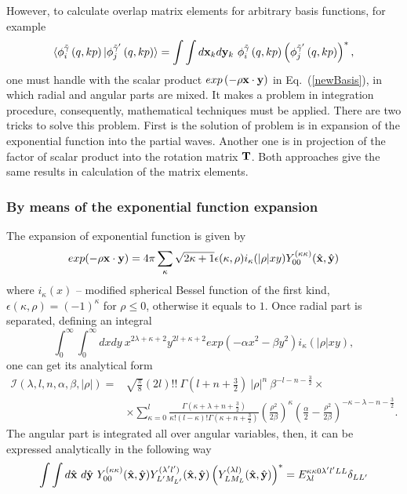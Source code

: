 \documentclass[12pt,a4paper,twoside]{article}
\begin{document}
However, to calculate overlap matrix elements for arbitrary basis functions, for example
\begin{equation}
\langle \phi_{i}^{\tilde{\gamma}}\left(q,kp \right) \vert 
\phi_{j}^{\tilde{\gamma}^{\prime}}\left(q,kp \right) \rangle =
\int \int d{\bf x}_k d{\bf y}_k ~\phi_{i}^{\tilde{\gamma}}\left(q,kp \right) \left( \phi_{j}^{\tilde{\gamma}^{\prime}}\left(q,kp \right) \right)^{*},
\label{me_arb}
\end{equation}
one must handle with the scalar product $exp\left(- \rho {\bf x} \cdot {\bf y} \right)$ in  Eq.~(\ref{newBasis}), in which radial and angular parts are mixed. It makes a problem in integration procedure, consequently, mathematical techniques must be applied. There are two tricks to solve this problem.  First is the solution of problem is in expansion of  the exponential function into the partial waves. Another one is in projection of the factor of scalar product into the rotation matrix ${\bf T}$. Both approaches give the same results in calculation of the matrix elements. 
\subsubsection{By means of the  exponential function expansion}
\label{overlap_by_exp}
The expansion of exponential function is given by 
\begin{equation}
exp(-\rho {\bf x} \cdot {\bf y}) = 4 \pi \sum_{\kappa} \sqrt{2\kappa+1} 
\epsilon(\kappa, \rho)i_{\kappa}(|\rho|xy)Y_{00}^{(\kappa\kappa)}(\hat{{\bf x}},\hat{{\bf y}})
\end{equation} 
where $i_{\kappa}(x) $ -- modified spherical Bessel function of the first kind, $\epsilon(\kappa, \rho)=(-1)^{\kappa}$ for $\rho \le 0$, otherwise it equals to $1$.
Once radial part is separated, defining an integral
\begin{equation}
\int_0^\infty \int_0^\infty  dx dy~ x^{2\lambda+\kappa+2}y^{2 l +\kappa+2} exp\left( -\alpha x^2 - \beta y^2 \right) i_{\kappa}(|\rho|xy),
\end{equation}
one can get its analytical form
\begin{align}
\mathcal{I}(\lambda, l, n, \alpha, \beta, |\rho|) =& \sqrt{\frac{\pi}{8}}(2l)!!~ \Gamma(l+n+\tfrac{3}{2})~|\rho|^{n} ~\beta^{-l-n-\tfrac{3}{2}} \times \nonumber \\
& \times \sum_{\kappa=0}^{l} \frac{\Gamma(\kappa+\lambda+n+\tfrac{3}{2})}{\kappa! (l-\kappa)! \Gamma(\kappa+n+\tfrac{3}{2})}
\left(\frac{\rho^2}{2\beta}\right)^{\kappa} \left( \frac{\alpha}{2} - \frac{\rho^2}{2\beta}  \right)^{-\kappa-\lambda-n-\tfrac{3}{2}}.
\label{overlap1}
\end{align}
The angular part is integrated all over angular variables, then,  it can be expressed analytically in the following way
\begin{align}
\int \int d\hat{\bf x}~d\hat{\bf y}~ Y_{00}^{(\kappa\kappa)}(\hat{{\bf x}},\hat{{\bf y}})  Y_{L^{\prime}M_{L^{\prime}}}^{(\lambda^{\prime} l^{\prime})}(\hat{{\bf x}},\hat{{\bf y}}) \left(  Y_{LM_L}^{(\lambda l)}(\hat{{\bf x}},\hat{{\bf y}}) \right)^{*} =  {E}^{\kappa \kappa 0 \lambda^{\prime} l^{\prime} L L}_{\lambda l} \delta_{LL^{\prime}} 
\label{angular_part_overlap1}
\end{align}
\end{document}
